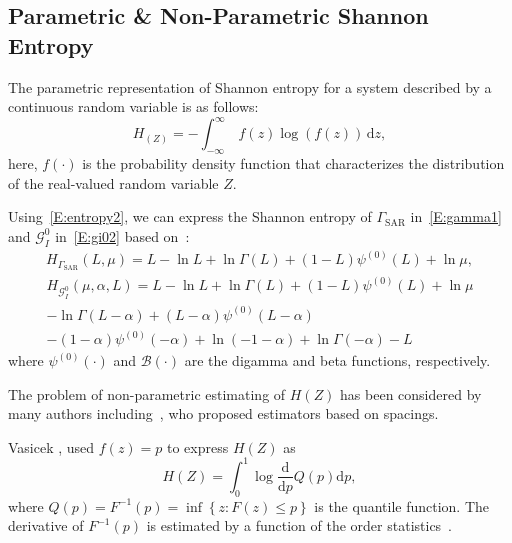 \documentclass[conference]{IEEEtran}
\begin{document}
\subsection{Parametric \& Non-Parametric Shannon Entropy}

The parametric representation of Shannon entropy for a system described by a continuous random variable is as follows:
\begin{equation}
  \label{E:entropy2}
  H_(Z)=-\int_{-\infty }^\infty \ f(z)\log(f(z))\, \mathrm{d}z,
\end{equation}
here, $f(\cdot)$ is the probability density function that characterizes the distribution of the real-valued random variable $Z$.

Using~\eqref{E:entropy2}, we can express the Shannon entropy of $\Gamma_{\text{SAR}}$ in~\eqref{E:gamma1} and $\mathcal{G}_I^0$ in~\eqref{E:gi02} based on~\cite{Cassetti2022, A.Ferreira2020}:
\begin{multline}
\label{E:E-gamma}
H_{\Gamma_{\text{SAR}}}(L, \mu) =   L -\ln L+\ln\Gamma(L)+(1-L)\psi^{(0)}(L) + \ln \mu, 
\end{multline}
\begin{multline}
\label{E:E-GIO}
H_{\mathcal{G}_I^0}(\mu, \alpha, L) =L -\ln L+\ln\Gamma(L)+(1-L)\psi^{(0)}(L) +\ln \mu \\
-\ln\Gamma(L-\alpha)+ (L-\alpha) \psi^{(0)}(L-\alpha)\\
-(1-\alpha)\psi^{(0)}(-\alpha)+\ln (-1-\alpha)+\ln\Gamma(-\alpha)-L
\end{multline}
where $\psi^{(0)}(\cdot)$ and $\mathcal{B}(\cdot)$ are the digamma and beta functions, respectively.







The problem of non-parametric estimating of $H(Z)$ has been considered by many authors including~\cite{vasicek1976test, Bert1992, Wieczorkowski1999, correa1995new}, who proposed estimators based on spacings.

Vasicek \cite{vasicek1976test}, used $f(z)=p$  to express $ H(Z)$ as
\begin{equation*}
	H(Z)= \int_0^1 \log\frac{\mathrm{d}}{\mathrm{d}p}Q(p)\mathrm{d}p,
\end{equation*}
where $Q(p)=F^{-1}(p)=\inf\left\{z: F(z)\leq p\right\}$ is the quantile function. The derivative of $F^{-1}(p)$ is  estimated by a function of the order statistics~\cite{AlOmari2019}.
\end{document}

